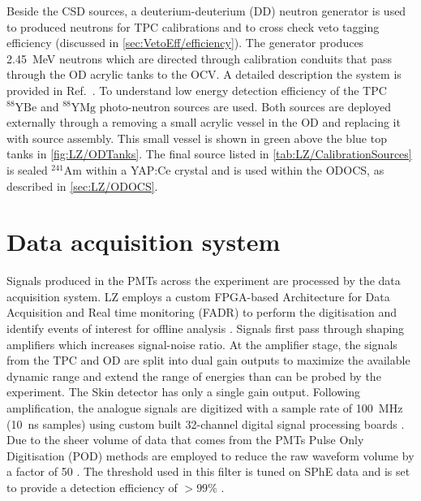 Beside the CSD sources, a deuterium-deuterium (DD) neutron generator is used to produced neutrons for TPC calibrations and to cross check veto tagging efficiency (discussed in \autoref{sec:VetoEff/efficiency}). The generator produces 2.45~MeV neutrons which are directed through calibration conduits that pass through the OD acrylic tanks to the OCV. A detailed description the system is provided in Ref.~\cite{LZ:2024bsz}. To understand low energy detection efficiency of the TPC $^{88}\text{YBe}$ and $^{88}\text{YMg}$ photo-neutron sources are used. Both sources are deployed externally through a removing a small acrylic vessel in the OD and replacing it with source assembly. This small vessel is shown in green above the blue top tanks in  \autoref{fig:LZ/ODTanks}.
The final source listed in \autoref{tab:LZ/CalibrationSources} is sealed $^{241}\text{Am}$ within a YAP:Ce crystal and is used within the ODOCS, as described in \autoref{sec:LZ/ODOCS}.

\section{Data acquisition system}\label{sec:LZ/LZDAQ}
Signals produced in the PMTs across the experiment are processed by the data acquisition system. LZ employs a custom FPGA-based Architecture for Data Acquisition and Real time monitoring (FADR) to perform the digitisation and identify events of interest for offline analysis \cite{LZ:2024bvw,Druszkiewicz:2015pcl}. 
Signals first pass through shaping amplifiers which increases signal-noise ratio. At the amplifier stage, the signals from the TPC and OD are split into dual gain outputs to maximize the available dynamic range and extend the range of energies than can be probed by the experiment. The Skin detector has only a single gain output. Following amplification, the analogue signals are digitized with a sample rate of 100~MHz (10~ns samples) using custom built 32-channel digital signal processing boards \cite{Druszkiewicz:2015pcl}. Due to the sheer volume of data that comes from the PMTs Pulse Only Digitisation (POD) methods are employed to reduce the raw waveform volume by a factor of 50 \cite{LZTDR}. The threshold used in this filter is tuned on SPhE data and is set to provide a detection efficiency of $>99\%$ \cite{LZ:2024bvw}. 

